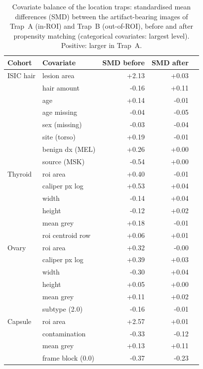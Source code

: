 \begin{table}[t]\centering\scriptsize
\caption{Covariate balance of the location traps: standardised mean differences (SMD) between the artifact-bearing images of Trap~A (in-ROI) and Trap~B (out-of-ROI), before and after propensity matching (categorical covariates: largest level). Positive: larger in Trap~A.}\label{tab:balance}
\begin{tabular}{llrrr}\toprule
Cohort & Covariate & SMD before & SMD after & \\\midrule
ISIC hair & lesion area & +2.13 & +0.03 & \\
 & hair amount & -0.16 & +0.11 & \\
 & age & +0.14 & -0.01 & \\
 & age missing & -0.04 & -0.05 & \\
 & sex (missing) & -0.03 & -0.04 & \\
 & site (torso) & +0.19 & -0.01 & \\
 & benign dx (MEL) & +0.26 & +0.00 & \\
 & source (MSK) & -0.54 & +0.00 & \\
\midrule
Thyroid & roi area & +0.40 & -0.01 & \\
 & caliper px log & +0.53 & +0.04 & \\
 & width & -0.14 & +0.04 & \\
 & height & -0.12 & +0.02 & \\
 & mean grey & +0.18 & -0.01 & \\
 & roi centroid row & +0.06 & +0.01 & \\
\midrule
Ovary & roi area & +0.32 & -0.00 & \\
 & caliper px log & +0.39 & +0.03 & \\
 & width & -0.30 & +0.04 & \\
 & height & +0.05 & +0.00 & \\
 & mean grey & +0.11 & +0.02 & \\
 & subtype (2.0) & -0.16 & -0.01 & \\
\midrule
Capsule & roi area & +2.57 & +0.01 & \\
 & contamination & -0.33 & -0.12 & \\
 & mean grey & +0.13 & +0.11 & \\
 & frame block (0.0) & -0.37 & -0.23 & \\
\bottomrule
\end{tabular}\end{table}
